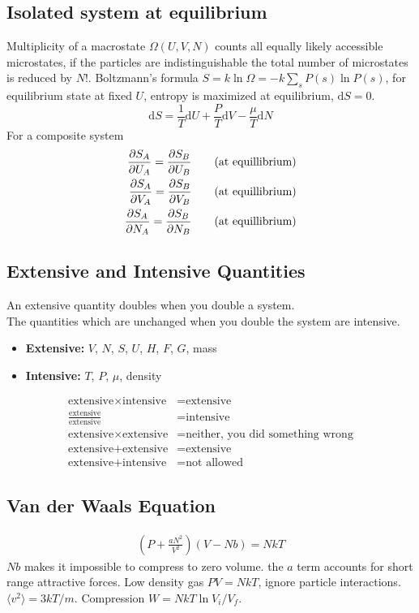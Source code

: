 \documentclass[a4paper, norsk, 8pt]{article}
\begin{document}
\begin{multicols*}{3}
\subsection*{\footnotesize  Isolated system at equilibrium}
Multiplicity of a macrostate $\Omega(U,V,N)$ counts all equally likely accessible microstates, if the particles are indistinguishable the total number of microstates is reduced by $N!$. Boltzmann's formula $S=k\ln{\Omega} = -k\sum_{s}P(s)\ln{P(s)}$, for equilibrium state at fixed $U$, entropy is maximized at equilibrium, $\mbox{d}S=0$.
\begin{equation*}
    \mbox{d}S = \frac{1}{T}\mbox{d}U  + \frac{P}{T}\mbox{d}V - \frac{\mu}{T}\mbox{d}N
\end{equation*}
For a composite system
\begin{align*}
  \pdv{S_A}{U_A} = \pdv{S_B}{U_B} \qquad (\text{at equillibrium}) \\
  \pdv{S_A}{V_A} = \pdv{S_B}{V_B} \qquad (\text{at equillibrium}) \\
  \pdv{S_A}{N_A} = \pdv{S_B}{N_B} \qquad (\text{at equillibrium})
\end{align*}

\subsection*{\footnotesize  Extensive and Intensive Quantities}
An extensive quantity doubles when you double a system.\\
The quantities which are unchanged when you double the system are intensive.
\begin{itemize}
    \item \textbf{Extensive:} $V$, $N$, $S$, $U$, $H$, $F$, $G$, mass
    \item \textbf{Intensive:} $T$, $P$, $\mu$, density
\end{itemize}
\begin{align*}
    \text{extensive} \times \text{intensive} &= \text{extensive} \\
     \frac{\text{extensive}}{\text{extensive}} &= \text{intensive} \\
     \text{extensive} \times \text{extensive} &= \text{neither, you did something wrong} \\
     \text{extensive} + \text{extensive} &= \text{extensive} \\
     \text{extensive} + \text{intensive} &= \text{not allowed}
\end{align*}


\subsection*{\footnotesize  Van der Waals Equation}
\begin{align*}
    \left( P + \frac{aN^2}{V^2}\right)\left(V-Nb\right) = NkT
\end{align*}
$Nb$ makes it impossible to compress to zero volume. the $a$ term accounts for short range attractive forces.
Low density gas $PV=NkT$, ignore particle interactions. $\langle v^2 \rangle = 3kT/m$. Compression $W =NkT\ln{V_i/V_f}$.


\end{multicols*}
\end{document}

